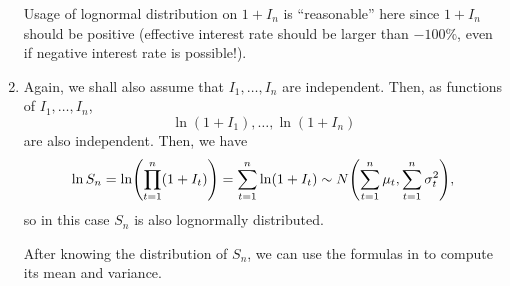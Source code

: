 \begin{enumerate}
\begin{note}
Usage of lognormal distribution on \(1+I_n\) is ``reasonable'' here since
\(1+I_n\) should be positive (effective interest rate should be larger than
\(-100\%\), even if negative interest rate is possible!).
\end{note}
\item \label{it:lognormal-acc-value-sn-dist}
Again, we shall also assume that \(I_1,\dotsc,I_n\) are independent.
Then, as functions of \(I_1,\dotsc,I_n\),
\[\ln(1+I_1),\dotsc,\ln(1+I_n)\]
are also independent. Then, we have
\[
\ln S_n=\ln(\prod_{t=1}^{n}(1+I_t))
=\sum_{t=1}^{n}\ln(1+I_t)
\sim N\qty(\sum_{t=1}^{n}\mu_t,\sum_{t=1}^{n}\sigma_t^2),
\]
so in this case \(S_n\) is also lognormally distributed.

\begin{note}
After knowing the distribution of \(S_n\), we can use the formulas in
 to compute its mean and variance.
\end{note}
\end{enumerate}

